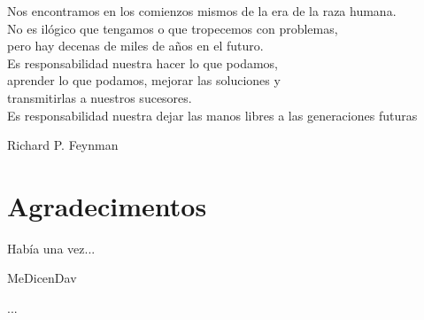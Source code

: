 %
%
%
%
%
%




\thispagestyle{plain}

\vspace*{0.4\textwidth}

\begin{FraseCelebreCentrada}
  \begin{FraseCentrada}
    Nos encontramos en los comienzos mismos de la era de la raza humana.\\
    No es ilógico que tengamos o que tropecemos con problemas, \\
    pero hay decenas de miles de años en el futuro. \\
    Es responsabilidad nuestra hacer lo que podamos, \\
    aprender lo que podamos, mejorar las soluciones y \\
    transmitirlas a nuestros sucesores. \\
    Es responsabilidad nuestra dejar las manos libres a las generaciones futuras
  \end{FraseCentrada}
  \begin{FuenteCentrada}
    Richard P. Feynman
  \end{FuenteCentrada}
\end{FraseCelebreCentrada}

\newpage



\thispagestyle{plain}
{}

\chapter*{Agradecimentos}
\begin{FraseCelebre}
  \begin{Frase}
    Había una vez...
  \end{Frase}
  \begin{Fuente}
    MeDicenDav
  \end{Fuente}
\end{FraseCelebre}


...


\cleardoublepage
\restauraCabecera
